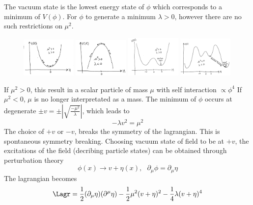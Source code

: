 The vacuum state is the lowest energy state of $\phi$ which corresponds to a minimum of $V(\phi)$. For $\phi$ to generate a minimum $\lambda>0$, however there are no such restrictions on $\mu^{2}$.
\begin{figure}[htpb]
	\centering
	\includegraphics[width=0.24\textwidth]{Figures/hpot1}
	\includegraphics[width=0.24\textwidth]{Figures/hpot2}
	\includegraphics[width=0.24\textwidth]{Figures/hpot3}
	\includegraphics[width=0.24\textwidth]{Figures/hpot4}
\end{figure}
If $\mu^{2}>0$, this result in a scalar particle of mass $\mu$ with self interaction $\propto\phi^{4}$
If $\mu^{2}<0$, $\mu$ is no longer interpretated as a mass. The minimum of $\phi$ occurs at degenerate $\pm v = \pm \left|\sqrt{\frac{-\mu^2}{\lambda}}\right|$, which leads to 
\begin{equation*}
	-\lambda v^2 = \mu^2
\end{equation*}
The choice of $+v$ or $-v$, breaks the symmetry of the lagrangian. This is spontaneous symmetry breaking.
Choosing vacuum state of field to be at $+v$, the excitations of the field (decribing particle states) can be obtained through perturbation theory
\begin{equation*}
	\phi(x)\to v + \eta(x), \,\,\,\, \partial_{\mu}\phi = \partial_{\mu}\eta
\end{equation*}
The lagrangian becomes
\begin{equation*}
	\Lagr = \frac{1}{2}(\partial_{\mu}\eta)(\partial^{\mu}\eta) - \frac{1}{2}\mu^{2}(v+\eta)^{2} - \frac{1}{4}\lambda(v+\eta)^{4}
\end{equation*}

